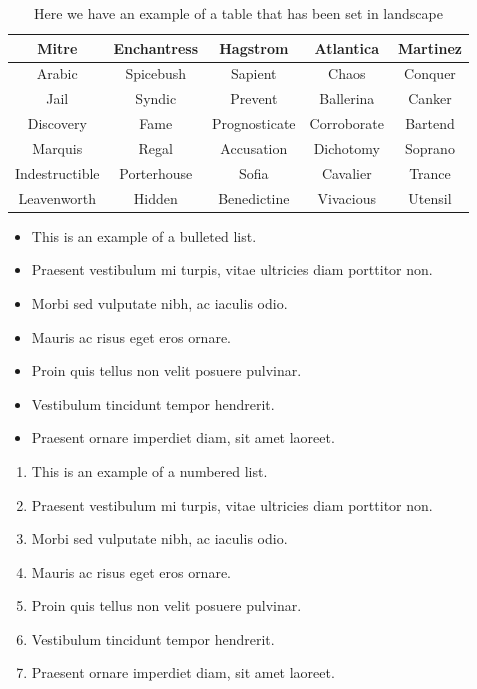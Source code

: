 \begin{sidewaystable}
\centering
\begin{tabular}{|ccccc|}
\hline
\textbf{Mitre} & \textbf{Enchantress} & \textbf{Hagstrom} &
\textbf{Atlantica} & \textbf{Martinez} \\
\hline
Arabic & Spicebush & Sapient & Chaos & Conquer \\
Jail & Syndic & Prevent & Ballerina & Canker \\
Discovery & Fame & Prognosticate & Corroborate & Bartend \\
Marquis & Regal & Accusation & Dichotomy & Soprano \\
Indestructible  & Porterhouse & Sofia & Cavalier & Trance \\
Leavenworth & Hidden & Benedictine & Vivacious & Utensil \\
\hline
\end{tabular}
\caption{Here we have an example of a table that has been set in landscape}
\end{sidewaystable}


\begin{itemize}
\item This is an example of a bulleted list.
\item Praesent vestibulum mi turpis, vitae ultricies diam porttitor non.
\item Morbi sed vulputate nibh, ac iaculis odio.
\item Mauris ac risus eget eros ornare.
\item Proin quis tellus non velit posuere pulvinar.
\item Vestibulum tincidunt tempor hendrerit.
\item Praesent ornare imperdiet diam, sit amet laoreet.
\end{itemize}


\begin{enumerate}
\item This is an example of a numbered list.
\item Praesent vestibulum mi turpis, vitae ultricies diam porttitor non.
\item Morbi sed vulputate nibh, ac iaculis odio.
\item Mauris ac risus eget eros ornare.
\item Proin quis tellus non velit posuere pulvinar.
\item Vestibulum tincidunt tempor hendrerit.
\item Praesent ornare imperdiet diam, sit amet laoreet.
\end{enumerate}

